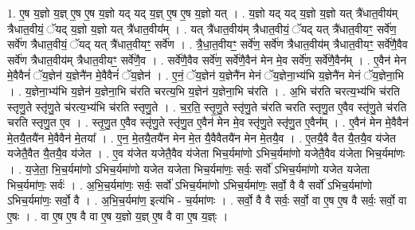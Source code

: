 \documentclass[17pt]{extarticle}
\begin{document}
1. ए॒ष य॒ज्ञो य॒ज्ञ् ए॒ष ए॒ष य॒ज्ञो यद् यद् य॒ज्ञ् ए॒ष ए॒ष य॒ज्ञो यत् । . य॒ज्ञो यद् यद् य॒ज्ञो य॒ज्ञो यत् त्रै॑धात॒वीय॑म् त्रैधात॒वीयं॒ ॅयद् य॒ज्ञो य॒ज्ञो यत् त्रै॑धात॒वीय᳚म् । . यत् त्रै॑धात॒वीय॑म् त्रैधात॒वीयं॒ ॅयद् यत् त्रै॑धात॒वीयꣳ॒॒ सर्वे॑ण॒ सर्वे॑ण त्रैधात॒वीयं॒ ॅयद् यत् त्रै॑धात॒वीयꣳ॒॒ सर्वे॑ण । . त्रै॒धा॒त॒वीयꣳ॒॒ सर्वे॑ण॒ सर्वे॑ण त्रैधात॒वीय॑म् त्रैधात॒वीयꣳ॒॒ सर्वे॑णै॒वैव सर्वे॑ण त्रैधात॒वीय॑म् त्रैधात॒वीयꣳ॒॒ सर्वे॑णै॒व । . सर्वे॑णै॒वैव सर्वे॑ण॒ सर्वे॑णै॒वैन॑ मेन मे॒व सर्वे॑ण॒ सर्वे॑णै॒वैन᳚म् । . ए॒वैन॑ मेन मे॒वैवैनं॑ ॅय॒ज्ञेन॑ य॒ज्ञेनै॑न मे॒वैवैनं॑ ॅय॒ज्ञेन॑ । . ए॒नं॒ ॅय॒ज्ञेन॑ य॒ज्ञेनै॑न मेनं ॅय॒ज्ञेना॒भ्य॑भि य॒ज्ञेनै॑न मेनं ॅय॒ज्ञेना॒भि । . य॒ज्ञेना॒भ्य॑भि य॒ज्ञेन॑ य॒ज्ञेना॒भि च॑रति चरत्य॒भि य॒ज्ञेन॑ य॒ज्ञेना॒भि च॑रति । . अ॒भि च॑रति चरत्य॒भ्य॑भि च॑रति स्तृणु॒ते स्तृ॑णु॒ते च॑रत्य॒भ्य॑भि च॑रति स्तृणु॒ते । . च॒र॒ति॒ स्तृ॒णु॒ते स्तृ॑णु॒ते च॑रति चरति स्तृणु॒त ए॒वैव स्तृ॑णु॒ते च॑रति चरति स्तृणु॒त ए॒व । . स्तृ॒णु॒त ए॒वैव स्तृ॑णु॒ते स्तृ॑णु॒त ए॒वैन॑ मेन मे॒व स्तृ॑णु॒ते स्तृ॑णु॒त ए॒वैन᳚म् । . ए॒वैन॑ मेन मे॒वैवैन॑ मे॒तयै॒तयै॑न मे॒वैवैन॑ मे॒तया᳚ । . ए॒न॒ मे॒तयै॒तयै॑न मेन मे॒त यै॒वैवैतयै॑न मेन मे॒तयै॒व । . ए॒तयै॒वै वैत यै॒तयै॒व य॑जेत यजेतै॒वैत यै॒तयै॒व य॑जेत । . ए॒व य॑जेत यजेतै॒वैव य॑जेता भिच॒र्यमा॑णो ऽभिच॒र्यमा॑णो यजेतै॒वैव य॑जेता भिच॒र्यमा॑णः । . य॒जे॒ता॒ भि॒च॒र्यमा॑णो ऽभिच॒र्यमा॑णो यजेत यजेता भिच॒र्यमा॑णः॒ सर्वः॒ सर्वो॑ ऽभिच॒र्यमा॑णो यजेत यजेता भिच॒र्यमा॑णः॒ सर्वः॑ । . अ॒भि॒च॒र्यमा॑णः॒ सर्वः॒ सर्वो॑ ऽभिच॒र्यमा॑णो ऽभिच॒र्यमा॑णः॒ सर्वो॒ वै वै सर्वो॑ ऽभिच॒र्यमा॑णो ऽभिच॒र्यमा॑णः॒ सर्वो॒ वै । . अ॒भि॒च॒र्यमा॑ण॒ इत्य॑भि - च॒र्यमा॑णः । . सर्वो॒ वै वै सर्वः॒ सर्वो॒ वा ए॒ष ए॒ष वै सर्वः॒ सर्वो॒ वा ए॒षः । . वा ए॒ष ए॒ष वै वा ए॒ष य॒ज्ञो य॒ज्ञ् ए॒ष वै वा ए॒ष य॒ज्ञ्ः । \newline
\end{document}
